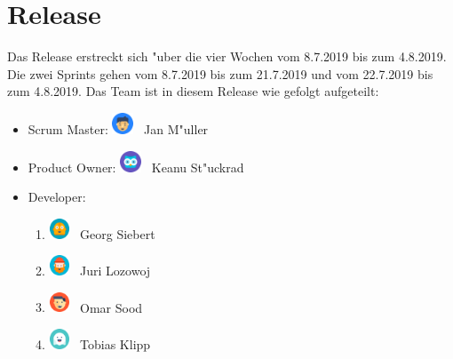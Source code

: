 \documentclass[12pt, titlepage]{scrartcl}
\newcommand{\RN}[1]{%
	\textup{\uppercase\expandafter{\romannumeral#1}}%
}
\begin{document}
    \section{Release \RN{3}}
        Das Release \RN{3} erstreckt sich "uber die vier Wochen vom 8.7.2019 bis zum 4.8.2019. Die zwei Sprints gehen vom 8.7.2019 bis zum 21.7.2019 und vom 22.7.2019 bis zum 4.8.2019.
        \vspace{0.1cm} \newline
        Das Team ist in diesem Release wie gefolgt aufgeteilt:
        \begin{itemize}
            \item Scrum Master:  \hspace{0.275cm} \includegraphics[width=0.05\textwidth]{images/avatars/jan.png} \ Jan M"uller
    		\item Product Owner:   \hspace{0.1cm} \includegraphics[width=0.05\textwidth]{images/avatars/keanu.png} \ Keanu St"uckrad
    		\item Developer:
    		\begin{enumerate}
    		    \item \includegraphics[width=0.05\textwidth]{images/avatars/georg.png} \ Georg Siebert
    		    \item \includegraphics[width=0.05\textwidth]{images/avatars/juri.png} \ Juri Lozowoj
    		    \item \includegraphics[width=0.05\textwidth]{images/avatars/omar.png} \ Omar Sood 
    		    \item \includegraphics[width=0.05\textwidth]{images/avatars/tobias.png} \ Tobias Klipp
    		\end{enumerate}
        \end{itemize}
\end{document}
